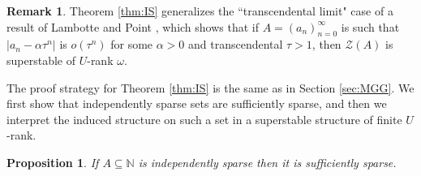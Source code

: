 \documentclass{amsart}
\def\seq{\subseteq}
\newcommand{\cZ}{\mathcal{Z}}
\def\N{\mathbb N}
\newtheorem{proposition}[theorem]{Proposition}
\theoremstyle{definition}
\newtheorem{remark}[theorem]{Remark}
\begin{document}
\begin{remark}
Theorem \ref{thm:IS} generalizes the ``transcendental limit" case of a result of Lambotte and Point \cite[Theorem 3.8]{PoLa}, which shows that if $A=(a_n)_{n=0}^\infty$ is such that $|a_n-\alpha\tau^n|$ is $o(\tau^n)$ for some $\alpha>0$ and transcendental $\tau>1$, then $\cZ(A)$ is superstable of $U$-rank $\omega$.
\end{remark}

The proof strategy for Theorem \ref{thm:IS} is the same as in Section \ref{sec:MGG}. We first show that independently sparse sets are sufficiently sparse, and then we interpret the induced structure on such a set in a superstable structure of finite $U$-rank. 


 
 \begin{proposition}\label{prop:ISss}
If $A\seq\N$ is independently sparse then it is sufficiently sparse.
\end{proposition}
\end{document}
